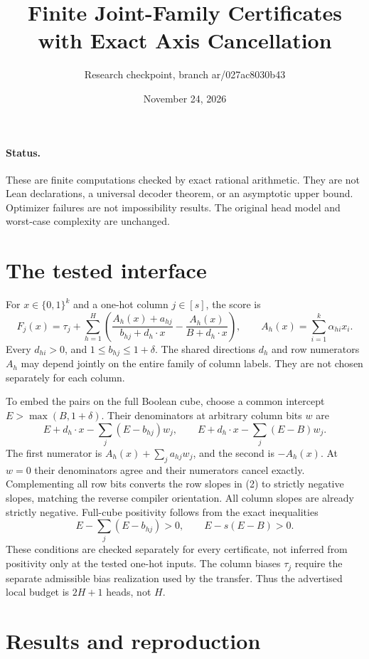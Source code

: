 \documentclass[11pt]{article}
\title{Finite Joint-Family Certificates with Exact Axis Cancellation}
\author{Research checkpoint, branch ar/027ac8030b43}
\date{November 24, 2026}
\begin{document}
\maketitle

\paragraph{Status.}
These are finite computations checked by exact rational arithmetic.
They are not Lean declarations, a universal decoder theorem, or an
asymptotic upper bound. Optimizer failures are not impossibility results.
The original head model and worst-case complexity are unchanged.

\section{The tested interface}

For $x\in\{0,1\}^k$ and a one-hot column $j\in[s]$, the score is
\[
F_j(x)=\tau_j+\sum_{h=1}^{H}\left(
\frac{A_h(x)+a_{hj}}{b_{hj}+d_h\cdot x}
-\frac{A_h(x)}{B+d_h\cdot x}\right),\qquad
A_h(x)=\sum_{i=1}^k\alpha_{hi}x_i.
\tag{1}
\]
Every $d_{hi}>0$, and $1\leq b_{hj}\leq1+\delta$. The shared directions
$d_h$ and row numerators $A_h$ may depend jointly on the entire family of
column labels. They are not chosen separately for each column.

To embed the pairs on the full Boolean cube, choose a common intercept
$E>\max(B,1+\delta)$. Their denominators at arbitrary column bits $w$ are
\[
E+d_h\cdot x-\sum_j(E-b_{hj})w_j,
\qquad
E+d_h\cdot x-\sum_j(E-B)w_j.
\tag{2}
\]
The first numerator is $A_h(x)+\sum_j a_{hj}w_j$, and the second is
$-A_h(x)$. At $w=0$ their denominators agree and their numerators cancel
exactly. Complementing all row bits converts the row slopes in (2) to
strictly negative slopes, matching the reverse compiler orientation.
All column slopes are already strictly negative. Full-cube positivity
follows from the exact inequalities
\[
E-\sum_j(E-b_{hj})>0,\qquad E-s(E-B)>0.
\tag{3}
\]
These conditions are checked separately for every certificate, not inferred
from positivity only at the tested one-hot inputs. The column biases
$\tau_j$ require the separate admissible bias realization used by the
transfer. Thus the advertised local budget is $2H+1$ heads, not $H$.

\section{Results and reproduction}
\end{document}
